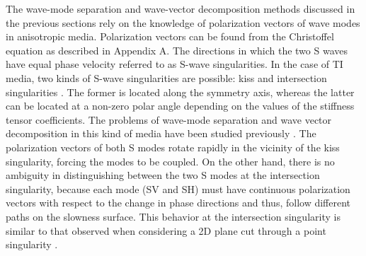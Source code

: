 The wave-mode separation and wave-vector decomposition methods discussed in the previous sections rely on the knowledge of polarization vectors of wave modes in anisotropic media. Polarization vectors can be found from the Christoffel equation as described in Appendix A. The directions in which the two S waves have equal phase velocity  referred to as S-wave singularities.
In the case of TI media, two kinds of S-wave singularities are possible: kiss and intersection singularities \cite[]{crampyedlin,cramp1984,cramp1991}. The former is located along the symmetry axis, whereas the latter can be located at a non-zero polar angle depending on the values of the stiffness tensor coefficients. The problems of wave-mode separation and wave vector decomposition in this kind of media have been studied previously \cite[]{yanvti,yantti,zm}. The polarization vectors of both S modes rotate rapidly in the vicinity of the kiss singularity, forcing the modes to be coupled. 
On the other hand, there is no ambiguity in distinguishing between the two S modes at the intersection singularity, because each mode (SV and SH) must have continuous polarization vectors with respect to the change in phase directions and thus, follow different paths on the slowness surface. This behavior at the intersection singularity is similar to that observed when considering a 2D plane cut through a point singularity \cite[]{vavsing}. 



